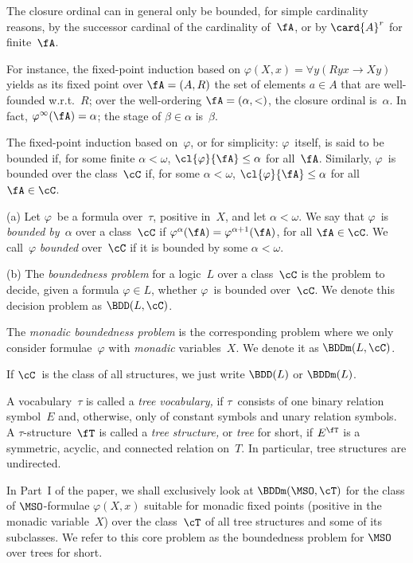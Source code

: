 \documentclass{LMCS}
\begin{document}
The closure ordinal can in general only be bounded, for simple
cardinality reasons, by the successor cardinal of the cardinality
of~$\fA$, or by $\card{A}^r$ for finite~$\fA$.

For instance, the fixed-point induction based on $\varphi(X,x) = \forall y (Ryx \to Xy)$
yields as its fixed point over $\fA = (A,R)$ the set of elements
$a \in A$ that are well-founded w.r.t.\ $R$\?;
over the well-ordering $\fA = (\alpha,{<})$, the closure ordinal is~$\alpha$.
In fact, $\varphi^\infty(\fA) = \alpha$\?;
the stage of $\beta \in \alpha$ is~$\beta$.

The fixed-point induction based on~$\varphi$, or for simplicity\?: $\varphi$~itself,
is said to be bounded if, for some finite $\alpha < \omega$,
$\cl{\varphi}{\fA} \leq \alpha$ for all~$\fA$.
Similarly, $\varphi$~is bounded
over the class~$\cC$ if, for some $\alpha < \omega$,
$\cl{\varphi}{\fA} \leq \alpha$ for all $\fA \in \cC$.

\begin{defi}
{\normalfont (a)} Let $\varphi$~be a formula over~$\tau$, positive in~$X$,
and let $\alpha < \omega$.
We say that $\varphi$~is \emph{bounded by~$\alpha$} over a class~$\cC$
if $\varphi^{\alpha}(\fA) = \varphi^{\alpha+1}(\fA)$, for all $\fA \in \cC$.
We call~$\varphi$ \emph{bounded} over~$\cC$
if it is bounded by some $\alpha < \omega$.

{\normalfont (b)} The \emph{boundedness problem} for a logic~$L$
over a class~$\cC$ is the problem to decide,
given a formula $\varphi \in L$, whether $\varphi$~is bounded over~$\cC$.
We denote this decision problem as $\BDD(L,\cC)$.

The \emph{monadic boundedness problem} is
the corresponding problem where we only consider formulae~$\varphi$
with \emph{monadic} variables~$X$.
We denote it as $\BDDm(L,\cC)$.

If $\cC$~is the class of all structures,
we just write $\BDD(L)$ or $\BDDm(L)$.
\end{defi}

A vocabulary~$\tau$ is called a \emph{tree vocabulary,}
if $\tau$~consists of one binary relation symbol~$E$
and, otherwise, only of constant symbols and unary relation symbols.
A $\tau$-structure~$\fT$ is called a \emph{tree structure,}
or \emph{tree} for short,
if $E^\fT$ is a symmetric, acyclic, and connected relation on~$T$.
In particular, tree structures are undirected.

In Part~I of the paper,
we shall exclusively look at $\BDDm(\MSO,\cT)$
for the class of $\MSO$-formulae $\varphi(X,x)$ suitable for
monadic fixed points (positive in the monadic variable~$X$)
over the class~$\cT$ of all tree structures
and some of its subclasses. We refer to this core problem as
the boundedness problem for $\MSO$ over trees for short.
\end{document}
